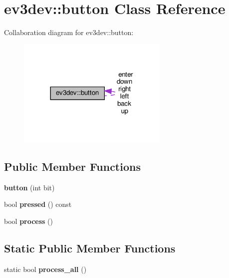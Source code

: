 \hypertarget{classev3dev_1_1button}{}\section{ev3dev\+:\+:button Class Reference}
\label{classev3dev_1_1button}


Collaboration diagram for ev3dev\+:\+:button\+:
\nopagebreak
\begin{figure}[H]
\begin{center}
\leavevmode
\includegraphics[width=204pt]{classev3dev_1_1button__coll__graph}
\end{center}
\end{figure}
\subsection*{Public Member Functions}
\begin{DoxyCompactItemize}
\item 
\mbox{\label{classev3dev_1_1button_a05b1ea7f093a4376329fcced2a7a916d}} 
{\bfseries button} (int bit)
\item 
\mbox{\label{classev3dev_1_1button_a30195113cc3c401e21f42635e927b26e}} 
bool {\bfseries pressed} () const
\item 
\mbox{\label{classev3dev_1_1button_a096d11d4ea525c8d646900b4e0e9a494}} 
bool {\bfseries process} ()
\end{DoxyCompactItemize}
\subsection*{Static Public Member Functions}
\begin{DoxyCompactItemize}
\item 
\mbox{\label{classev3dev_1_1button_a6ac47d830098fb519eb72f3650e6dc43}} 
static bool {\bfseries process\+\_\+all} ()
\end{DoxyCompactItemize}
